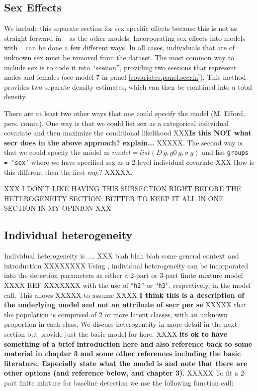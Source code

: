 \subsection{Sex Effects}

We include this separate section for sex specific effects because
this is not as straight forward in \secr~ as the other models. 
Incorporating sex effects into models with \secr~ can be done a few
different ways.  In all cases, individuals that
are of unknown sex must be removed from the dataset.
The most common way to include
sex is to code it into ``session'', providing two sessions that
represent males and females (see model 7 in 
panel \ref{covariates.panel.secrfn}).  This method provides two separate density
estimates, which can then be combined into a total density.  

There are at least two other ways that one could
specify the model (M. Efford, pers. comm).  One way is that we could
list sex as a categorical individual covariate and then maximize the
conditional likelihood XXX{\bf Is this NOT what secr does in the above
  approach? explain...} XXXXX.  The second way is that we could specify the
model as $model = list(D~g, g0~g, \sigma~g)$ and list \mbox{\tt groups = 'sex'}
where we have specified sex as a 2-level individual covariate XXX How
is this different then the first way? XXXXX.  


XXX I DON'T LIKE HAVING THIS SUBSECTION RIGHT BEFORE THE HETEROGENEITY SECTION; BETTER TO KEEP IT ALL IN ONE SECTION IN MY OPINION XXX
\subsection{Individual heterogeneity}

Individual heterogeneity is .... XXX blah blah blah some general
context and introduction XXXXXXXX
Using \secr,  individual heterogeneity can be incorporated
into the detection parameters as either a 2-part or 3-part finite
mixture model XXXX REF XXXXXXX with the use of ``\mbox{\tt h2}'' or
``\mbox{\tt h3}'', respectively, in the
model call.   This allows  XXXXX to assume  XXXX
{\bf I
think this is a description of the underlying model and not an
attribute of secr per se} XXXXX that the population is
comprised of 2 or more latent classes, with an unknown proportion in
each class.  We discuss heterogeneity in more detail in the next
section but provide just the basic model for \secr here.
XXXX
{\bf its ok
to have something of a brief introduction here and also reference back
to some material in chapter 3 and some other references including the
basic literature. Especially state what the model is and note that
there are other options (and reference below, and chapter 3). }
XXXXX
To fit a
2-part finite mixture for baseline detection we use the following
function call:

